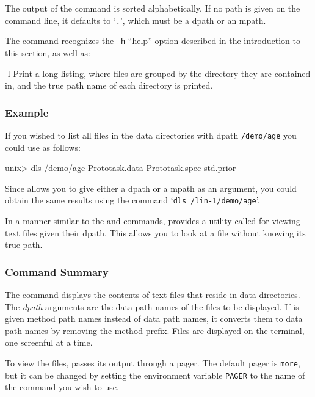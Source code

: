 The output of the command is sorted alphabetically.  If no path is
given on the command line, it defaults to `\texttt{.}', which must be
a dpath or an mpath.

The \dls{} command recognizes the \texttt{-h} ``help'' option described in
the introduction to this section, as well as:
\begin{ttdescription}
\item[-l] 
    Print a long listing, where files are grouped by the directory
    they are contained in, and the true path name of each directory is
    printed.
\end{ttdescription}

\subsubsection*{Example}

If you wished to list all files in the data directories with dpath
\texttt{/demo/age} you could use \dls{} as follows:
%
\begin{Session}
unix> dls /demo/age
Prototask.data  Prototask.spec  std.prior
\end{Session}
%
Since \dls{} allows you to give either a dpath or a mpath as an
argument, you could obtain the same results using the command
`\texttt{dls /lin-1/demo/age}'.

%
%


In a manner similar to the \dls{} and \mls{} commands, \delve{}
provides a utility called \dmore{} for viewing text files given their
dpath.  This allows you to look at a file without knowing its true
path.

\subsubsection*{Command Summary}

The \dmore{} command displays the contents of text files that reside
in \delve{} data directories.  The \textit{dpath} arguments are the
data path names of the files to be displayed.  If \dmore{} is given
method path names instead of data path names, it converts them to data
path names by removing the method prefix.  Files are displayed on the
terminal, one screenful at a time.

To view the files, \dmore{} passes its output through a pager.  The
default pager is \texttt{more}, but it can be changed by setting the
environment variable \texttt{PAGER} to the name of the command you
wish to use.

